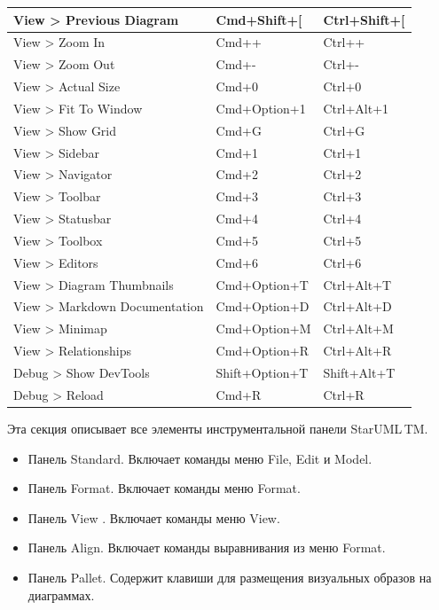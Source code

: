 \documentclass[a4paper,12pt]{report}
\newcommand{\staruml}{StarUML\,\tm}
\begin{document}
\begin{longtable}{|l|l|l|}
			View > Previous Diagram & Cmd+Shift+[ & Ctrl+Shift+[ \\ \hline
			View > Zoom In & Cmd++ & Ctrl++ \\ \hline
			View > Zoom Out & Cmd+- & Ctrl+- \\ \hline
			View > Actual Size & Cmd+0 & Ctrl+0 \\ \hline
			View > Fit To Window & Cmd+Option+1 & Ctrl+Alt+1 \\ \hline
			View > Show Grid & Cmd+G & Ctrl+G \\ \hline
			View > Sidebar & Cmd+1 & Ctrl+1 \\ \hline
			View > Navigator & Cmd+2 & Ctrl+2 \\ \hline
			View > Toolbar & Cmd+3 & Ctrl+3 \\ \hline
			View > Statusbar & Cmd+4 & Ctrl+4 \\ \hline
			View > Toolbox & Cmd+5 & Ctrl+5 \\ \hline
			View > Editors & Cmd+6 & Ctrl+6 \\ \hline
			View > Diagram Thumbnails & Cmd+Option+T & Ctrl+Alt+T \\ \hline
			View > Markdown Documentation & Cmd+Option+D & Ctrl+Alt+D \\ \hline
			View > Minimap & Cmd+Option+M & Ctrl+Alt+M \\ \hline
			View > Relationships & Cmd+Option+R & Ctrl+Alt+R \\ \hline
			Debug > Show DevTools & Shift+Option+T & Shift+Alt+T \\ \hline
			Debug > Reload & Cmd+R & Ctrl+R \\ \hline
\end{longtable}
\normalsize

Эта секция описывает все элементы инструментальной панели \staruml TM.
\begin{itemize}
	\item Панель Standard. Включает команды меню File, Edit и Model.
	\item Панель Format. Включает команды меню Format.
	\item Панель View . Включает команды меню View.
	\item Панель Align. Включает команды выравнивания из меню Format.
	\item Панель Pallet. Содержит клавиши для размещения визуальных образов на диаграммах.
\end{itemize}
\end{document}
